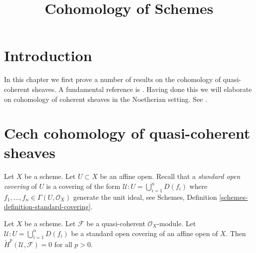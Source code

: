 

%


\title{Cohomology of Schemes}


\maketitle

\label{section-phantom}

\tableofcontents

\section{Introduction}
\label{section-introduction}

\noindent
In this chapter we first prove a number of results on the cohomology of
quasi-coherent sheaves. A fundamental reference is \cite{EGA}.
Having done this we will elaborate on cohomology of
coherent sheaves in the Noetherian setting. See \cite{FAC}.







\section{Cech cohomology of quasi-coherent sheaves}
\label{section-cech-quasi-coherent}

\noindent
Let $X$ be a scheme.
Let $U \subset X$ be an affine open.
Recall that a {\it standard open covering} of $U$ is a covering
of the form $\mathcal{U} : U = \bigcup_{i = 1}^n D(f_i)$
where $f_1, \ldots, f_n \in \Gamma(U, \mathcal{O}_X)$ generate
the unit ideal, see
Schemes, Definition \ref{schemes-definition-standard-covering}.

\begin{lemma}
\label{lemma-cech-cohomology-quasi-coherent-trivial}
Let $X$ be a scheme.
Let $\mathcal{F}$ be a quasi-coherent $\mathcal{O}_X$-module.
Let $\mathcal{U} : U = \bigcup_{i = 1}^n D(f_i)$ be a standard
open covering of an affine open of $X$.
Then $\check{H}^p(\mathcal{U}, \mathcal{F}) = 0$ for
all $p > 0$.
\end{lemma}

